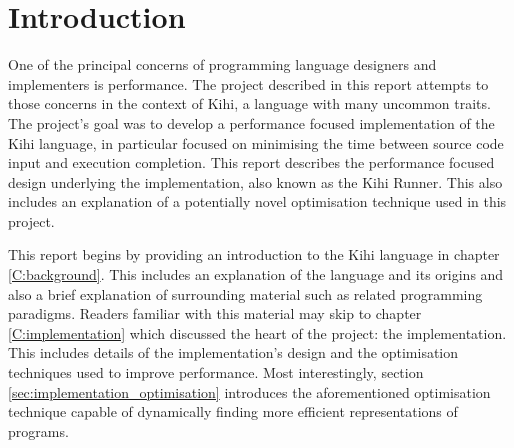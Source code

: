 \chapter{Introduction} \label{C:intro}
One of the principal concerns of programming language designers
and implementers is performance. The project described in this report attempts to those concerns in the context of Kihi, a language with many uncommon traits. The project's goal was to develop a performance focused implementation of the Kihi language, in particular focused on minimising the time between source code input and execution completion. This report describes the performance focused design underlying the implementation, also known as the Kihi Runner. This also includes an explanation of a potentially novel optimisation technique used in this project.

This report begins by providing an introduction to the Kihi language in chapter \ref{C:background}. This includes an explanation of the language and its origins and also a brief explanation of surrounding material such as related programming paradigms. Readers familiar with this material may skip to chapter \ref{C:implementation} which discussed the heart of the project: the implementation. This includes details of the implementation's design and the optimisation techniques used to improve performance. Most interestingly, section \ref{sec:implementation_optimisation} introduces the aforementioned optimisation technique capable of dynamically finding more efficient representations of programs.


